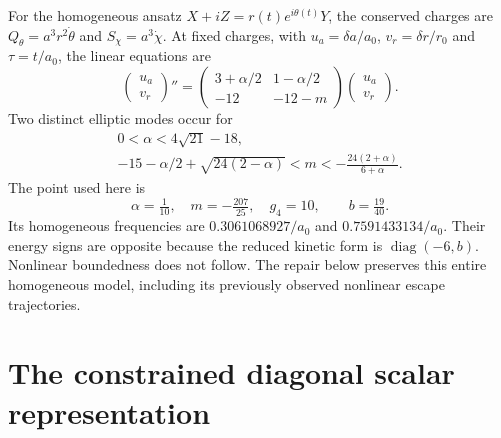 \documentclass[11pt]{article}
\newcommand{\diag}{\operatorname{diag}}
\numberwithin{equation}{section}
\begin{document}
For the homogeneous ansatz $X+iZ=r(t)e^{i\theta(t)}Y$, the conserved charges are $Q_\theta=a^3r^2\dot\theta$ and $S_\chi=a^3\dot\chi$.
At fixed charges, with $u_a=\delta a/a_0$, $v_r=\delta r/r_0$ and $\tau=t/a_0$, the linear equations are
\begin{equation}
 \begin{pmatrix}u_a\\v_r\end{pmatrix}''=
 \begin{pmatrix}3+\alpha/2&1-\alpha/2\\-12&-12-m\end{pmatrix}
 \begin{pmatrix}u_a\\v_r\end{pmatrix}.
\end{equation}
Two distinct elliptic modes occur for
\begin{gather}
 0<\alpha<4\sqrt{21}-18,\label{eq:windowa}\\
 -15-\alpha/2+\sqrt{24(2-\alpha)}<m<-
 \frac{24(2+\alpha)}{6+\alpha}.\label{eq:windowm}
\end{gather}
The point used here is
\begin{equation}
 \alpha=\tfrac1{10},\quad m=-\tfrac{207}{25},\quad g_4=10,
 \qquad b=\tfrac{19}{40}.
 \label{eq:radialpoint}
\end{equation}
Its homogeneous frequencies are $0.3061068927/a_0$ and $0.7591433134/a_0$.
Their energy signs are opposite because the reduced kinetic form is $\diag(-6,b)$.
Nonlinear boundedness does not follow.
The repair below preserves this entire homogeneous model, including its previously observed nonlinear escape trajectories.

\section{The constrained diagonal scalar representation}
\label{sec:scalar}
\end{document}
